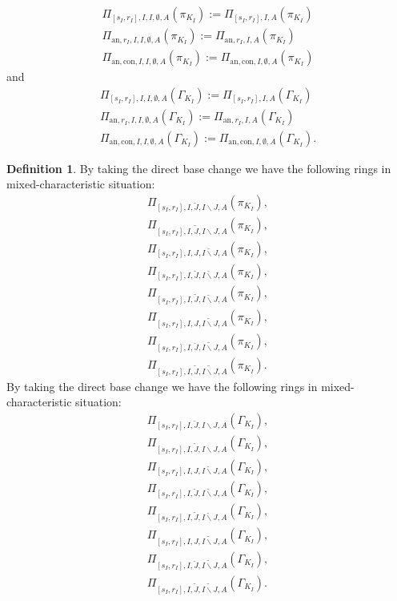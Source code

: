 \documentclass[12pt]{amsart}
\theoremstyle{definition}
\newtheorem{definition}[theorem]{Definition}
\numberwithin{equation}{section}
\begin{document}
\begin{align}
\Pi_{[s_I,r_I],I,I,\emptyset,A}(\pi_{K_I}):=\Pi_{[s_I,r_I],I,A}(\pi_{K_I})\\
\Pi_{\mathrm{an},r_I,I,I,\emptyset,A}(\pi_{K_I}):=\Pi_{\mathrm{an},r_I,I,A}(\pi_{K_I})\\
\Pi_{\mathrm{an,con},I,I,\emptyset,A}(\pi_{K_I}):=\Pi_{\mathrm{an,con},I,\emptyset,A}(\pi_{K_I})	
\end{align}
and
\begin{align}
\Pi_{[s_I,r_I],I,I,\emptyset,A}(\Gamma_{K_I}):=\Pi_{[s_I,r_I],I,A}(\Gamma_{K_I})\\
\Pi_{\mathrm{an},r_I,I,I,\emptyset,A}(\Gamma_{K_I}):=\Pi_{\mathrm{an},r_I,I,A}(\Gamma_{K_I})\\
\Pi_{\mathrm{an,con},I,I,\emptyset,A}(\Gamma_{K_I}):=\Pi_{\mathrm{an,con},I,\emptyset,A}(\Gamma_{K_I}).	
\end{align}


\begin{definition}
By taking the direct base change we have the following rings in mixed-characteristic situation:
\begin{align}
\Pi_{[s_I,r_I],I,\breve{J},I\backslash J,A}(\pi_{K_I}),\\	
\Pi_{[s_I,r_I],I,\widetilde{J},I\backslash J,A}(\pi_{K_I}),\\
\Pi_{[s_I,r_I],I,J,\breve{I\backslash J},A}(\pi_{K_I}),\\	
\Pi_{[s_I,r_I],I,\breve{J},\breve{I\backslash J},A}(\pi_{K_I}),\\	
\Pi_{[s_I,r_I],I,\widetilde{J},\breve{I\backslash J},A}(\pi_{K_I}),\\
\Pi_{[s_I,r_I],I,J,\widetilde{I\backslash J},A}(\pi_{K_I}),\\	
\Pi_{[s_I,r_I],I,\breve{J},\widetilde{I\backslash J},A}(\pi_{K_I}),\\	
\Pi_{[s_I,r_I],I,\widetilde{J},\widetilde{I\backslash J},A}(\pi_{K_I}).	
\end{align}
By taking the direct base change we have the following rings in mixed-characteristic situation:
\begin{align}
\Pi_{[s_I,r_I],I,\breve{J},I\backslash J,A}(\Gamma_{K_I}),\\	
\Pi_{[s_I,r_I],I,\widetilde{J},I\backslash J,A}(\Gamma_{K_I}),\\
\Pi_{[s_I,r_I],I,J,\breve{I\backslash J},A}(\Gamma_{K_I}),\\	
\Pi_{[s_I,r_I],I,\breve{J},\breve{I\backslash J},A}(\Gamma_{K_I}),\\
\Pi_{[s_I,r_I],I,\widetilde{J},\breve{I\backslash J},A}(\Gamma_{K_I}),\\
\Pi_{[s_I,r_I],I,J,\widetilde{I\backslash J},A}(\Gamma_{K_I}),\\	
\Pi_{[s_I,r_I],I,\breve{J},\widetilde{I\backslash J},A}(\Gamma_{K_I}),\\	
\Pi_{[s_I,r_I],I,\widetilde{J},\widetilde{I\backslash J},A}(\Gamma_{K_I}).	
\end{align}	
\end{definition}
\end{document}
